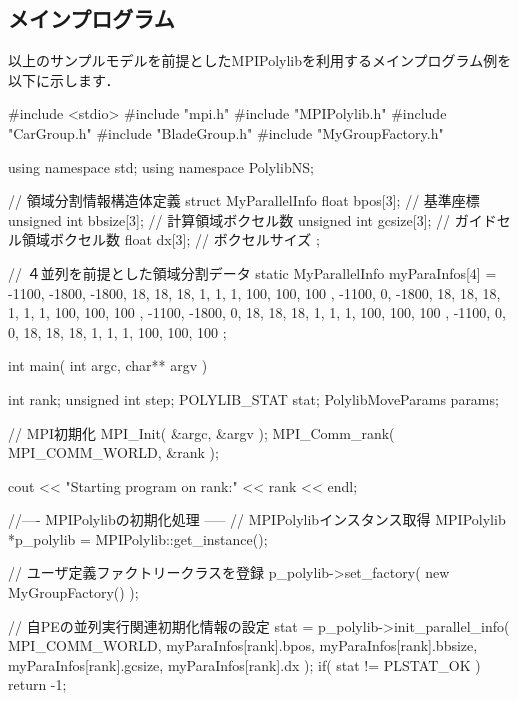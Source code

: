 {\pagebreak

%
\subsection{メインプログラム}

以上のサンプルモデルを前提としたMPIPolylibを利用するメインプログラム例を以下に示します．

\begin{program}
#include <stdio>
#include "mpi.h"
#include "MPIPolylib.h"
#include "CarGroup.h"
#include "BladeGroup.h"
#include "MyGroupFactory.h"

using namespace std;
using namespace PolylibNS;

// 領域分割情報構造体定義
struct MyParallelInfo {
    float          bpos[3];  // 基準座標
    unsigned int bbsize[3];  // 計算領域ボクセル数
    unsigned int gcsize[3];  // ガイドセル領域ボクセル数
    float            dx[3];  // ボクセルサイズ
};

// ４並列を前提とした領域分割データ
static MyParallelInfo myParaInfos[4] = {
    {{-1100, -1800, -1800}, {18, 18, 18}, {1, 1, 1}, {100, 100, 100} },
    {{-1100,     0, -1800}, {18, 18, 18}, {1, 1, 1}, {100, 100, 100} },
    {{-1100, -1800,     0}, {18, 18, 18}, {1, 1, 1}, {100, 100, 100} },
    {{-1100,     0,     0}, {18, 18, 18}, {1, 1, 1}, {100, 100, 100} }
};

int main( int argc, char** argv )
{
    int             rank;
    unsigned int  step;
    POLYLIB_STAT  stat;
    PolylibMoveParams params;

    // MPI初期化
    MPI_Init( &argc, &argv );
    MPI_Comm_rank( MPI_COMM_WORLD, &rank );

    cout << "Starting program on rank:" << rank << endl;

    //---- MPIPolylibの初期化処理 -----
    // MPIPolylibインスタンス取得
    MPIPolylib *p_polylib = MPIPolylib::get_instance();

    // ユーザ定義ファクトリークラスを登録
    p_polylib->set_factory( new MyGroupFactory() );

    // 自PEの並列実行関連初期化情報の設定
    stat = p_polylib->init_parallel_info( MPI_COMM_WORLD,
                                    myParaInfos[rank].bpos,
                                    myParaInfos[rank].bbsize,
                                    myParaInfos[rank].gcsize,
                                    myParaInfos[rank].dx
                                );
    if( stat != PLSTAT_OK ) return -1;

}
\end{program}}
